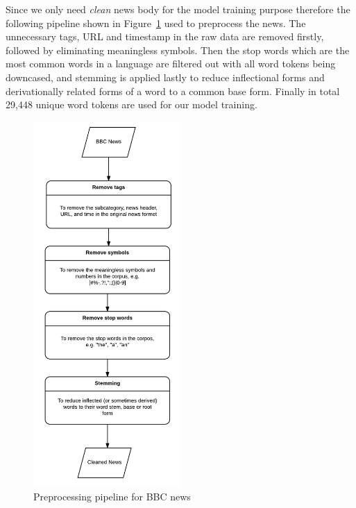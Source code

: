 Since we only need \textit{clean} news body for the model training purpose therefore the following pipeline shown in Figure~\ref{fig:pipeline} used to preprocess the news. The unnecessary tags, URL and timestamp in the raw data are removed firstly, followed by eliminating meaningless symbols. Then the stop words which are the most common words in a language are filtered out with all word tokens being downcased, and stemming is applied lastly to reduce inflectional forms and  derivationally related forms of a word to a common base form. Finally in total 29,448 unique word tokens are used for our model training.
\begin{figure}[h]
\centering
\includegraphics[width=0.5\textwidth]{figures/pipeline.png}
\caption{Preprocessing pipeline for BBC news}
\label{fig:pipeline}
\end{figure}

